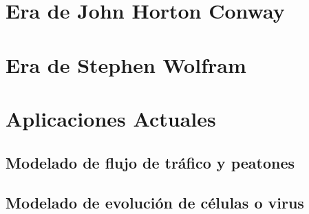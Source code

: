 
\section{Era de John Horton Conway} %



\section{Era de Stephen Wolfram} %


\section{Aplicaciones Actuales} %

\subsection{Modelado de flujo de tráfico y peatones}

\subsection{Modelado de evolución de células o virus}







